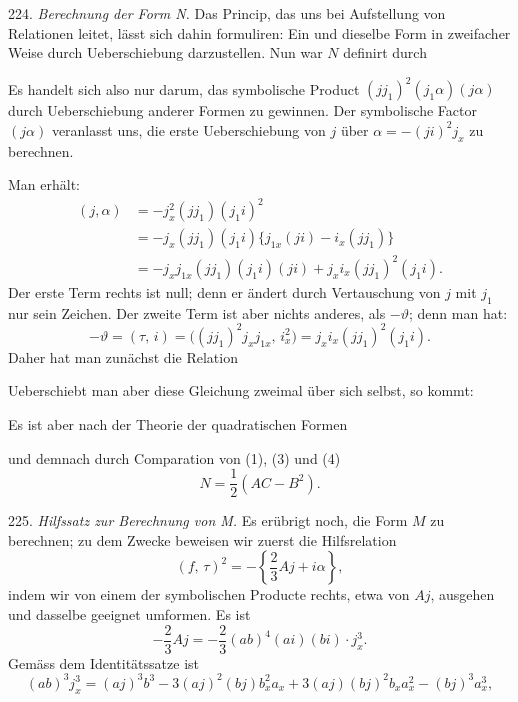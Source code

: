 
224. \textit{Berechnung der Form N.} Das Princip, das uns bei Aufstellung von Relationen leitet, lässt sich dahin formuliren: Ein und dieselbe Form in zweifacher Weise durch Ueberschiebung darzustellen. Nun war $N$ definirt durch


Es handelt sich also nur darum, das symbolische Product $(jj_1)^2(j_1\alpha)(j\alpha)$ durch Ueberschiebung anderer Formen zu gewinnen. Der symbolische Factor $(j\alpha)$ veranlasst uns, die erste Ueberschiebung von $j$ über $\alpha = -(ji)^2j_x$ zu berechnen.

Man erhält:
\[
\begin{aligned}
(j,\alpha) &= -j_x^2(jj_1)(j_1i)^2\\
&= -j_x(jj_1)(j_1i)\{j_{1x}(ji) - i_x(jj_1)\}\\
&= -j_xj_{1x}(jj_1)(j_1i)(ji) + j_xi_x(jj_1)^2(j_1i).
\end{aligned}
\]
Der erste Term rechts ist null; denn er ändert durch Vertauschung von $j$ mit $j_1$ nur sein Zeichen. Der zweite Term ist aber nichts anderes, als $-\vartheta$; denn man hat:
\[
-\vartheta = (\tau,\,i) = \big((jj_1)^2j_xj_{1x},\,i_x^2\big) = j_xi_x(jj_1)^2(j_1i).
\]
Daher hat man zunächst die Relation


Ueberschiebt man aber diese Gleichung zweimal über sich selbst, so kommt:


Es ist aber nach der Theorie der quadratischen Formen


und demnach durch Comparation von (1), (3) und (4)
\[
N = \frac{1}{2}(AC-B^2).
\]

225. \textit{Hilfssatz zur Berechnung von M.} Es erübrigt noch, die Form $M$ zu berechnen; zu dem Zwecke beweisen wir zuerst die Hilfsrelation
\[
(f,\,\tau)^2 = -\left\{\frac{2}{3}Aj + i\alpha\right\},
\]
indem wir von einem der symbolischen Producte rechts, etwa von $Aj$, ausgehen und dasselbe geeignet umformen. Es ist
\[
-\frac{2}{3}Aj = -\frac{2}{3}(ab)^4(ai)(bi)\cdot j_x^3.
\]
Gemäss dem Identitätssatze ist
\[
(ab)^3j_x^3 = (aj)^3b^3 - 3(aj)^2(bj)b_x^2a_x + 3(aj)(bj)^2b_xa_x^2 - (bj)^3a_x^3,
\]


